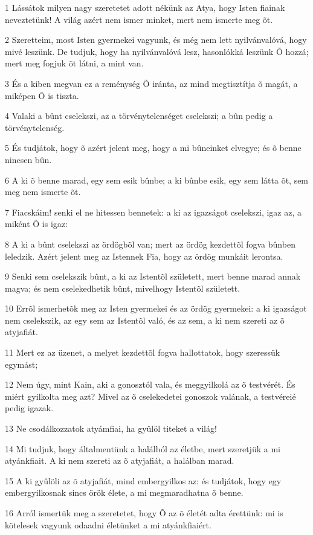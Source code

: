 \par 1 Lássátok milyen nagy szeretetet adott nékünk az Atya, hogy Isten fiainak neveztetünk! A világ azért nem ismer minket, mert nem ismerte  meg õt.
\par 2 Szeretteim, most Isten gyermekei vagyunk, és még nem lett nyilvánvalóvá, hogy mivé leszünk. De tudjuk, hogy ha nyilvánvalóvá lesz, hasonlókká leszünk Õ hozzá; mert meg fogjuk õt látni, a mint van.
\par 3 És a kiben megvan ez a reménység Õ iránta, az mind megtisztítja õ magát, a miképen Õ is tiszta.
\par 4 Valaki a bûnt cselekszi, az a törvénytelenséget cselekszi; a bûn pedig a törvénytelenség.
\par 5 És tudjátok, hogy õ azért jelent meg, hogy a mi bûneinket elvegye; és õ benne nincsen  bûn.
\par 6 A ki õ benne marad, egy sem esik bûnbe; a ki bûnbe esik, egy sem látta õt, sem meg nem ismerte õt.
\par 7 Fiacskáim! senki el ne hitessen bennetek: a ki az igazságot cselekszi, igaz az, a miként Õ is igaz:
\par 8 A ki a bûnt cselekszi az ördögbõl van; mert az ördög kezdettõl fogva bûnben leledzik. Azért jelent meg az Istennek Fia, hogy az ördög munkáit lerontsa.
\par 9 Senki sem cselekszik bûnt, a ki az Istentõl született, mert benne marad annak magva;  és nem cselekedhetik bûnt, mivelhogy Istentõl született.
\par 10 Errõl ismerhetõk meg az Isten gyermekei és az ördög gyermekei: a ki igazságot nem cselekszik, az egy sem az Istentõl való, és az sem, a ki nem szereti az õ atyjafiát.
\par 11 Mert ez az üzenet, a melyet kezdettõl fogva hallottatok, hogy szeressük  egymást;
\par 12 Nem úgy, mint Kain, aki a gonosztól  vala, és meggyilkolá az õ testvérét. És miért gyilkolta meg azt? Mivel az õ cselekedetei gonoszok valának, a testvéreié pedig igazak.
\par 13 Ne csodálkozzatok atyámfiai, ha gyûlöl titeket a világ!
\par 14 Mi tudjuk, hogy általmentünk a halálból az életbe, mert szeretjük a mi atyánkfiait. A ki nem szereti az õ atyjafiát, a halálban marad.
\par 15 A ki gyûlöli az õ atyjafiát, mind embergyilkos az: és tudjátok, hogy egy embergyilkosnak sincs örök élete, a mi megmaradhatna õ benne.
\par 16 Arról ismertük meg a szeretetet, hogy Õ az õ életét adta érettünk: mi is kötelesek vagyunk odaadni életünket a mi atyánkfiaiért.
